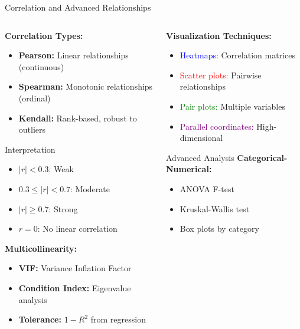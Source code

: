 \documentclass[8pt,aspectratio=1610]{beamer}
\begin{document}
\begin{frame}{Correlation and Advanced Relationships}
\begin{columns}[t]
\begin{column}{0.48\textwidth}
\textbf{Correlation Types:}
\begin{itemize}
\setlength{\itemsep}{1pt}
\item \textbf{Pearson:} Linear relationships (continuous)
\item \textbf{Spearman:} Monotonic relationships (ordinal)
\item \textbf{Kendall:} Rank-based, robust to outliers
\end{itemize}

\vspace{0.3cm}
\begin{block}{Interpretation}
\begin{itemize}
\setlength{\itemsep}{1pt}
\item $|r| < 0.3$: Weak
\item $0.3 \leq |r| < 0.7$: Moderate
\item $|r| \geq 0.7$: Strong
\item $r = 0$: No linear correlation
\end{itemize}
\end{block}

\textbf{Multicollinearity:}
\begin{itemize}
\setlength{\itemsep}{1pt}
\item \textbf{VIF:} Variance Inflation Factor
\item \textbf{Condition Index:} Eigenvalue analysis
\item \textbf{Tolerance:} $1 - R^2$ from regression
\end{itemize}
\end{column}

\begin{column}{0.48\textwidth}
\textbf{Visualization Techniques:}
\begin{itemize}
\setlength{\itemsep}{1pt}
\item \textcolor{blue}{Heatmaps:} Correlation matrices
\item \textcolor{red}{Scatter plots:} Pairwise relationships
\item \textcolor{green}{Pair plots:} Multiple variables
\item \textcolor{purple}{Parallel coordinates:} High-dimensional
\end{itemize}

\vspace{0.3cm}
\begin{block}{Advanced Analysis}
\textbf{Categorical-Numerical:}
\begin{itemize}
\setlength{\itemsep}{1pt}
\item ANOVA F-test
\item Kruskal-Wallis test
\item Box plots by category
\end{itemize}


\end{block}
\end{column}
\end{columns}
\end{frame}
\end{document}
